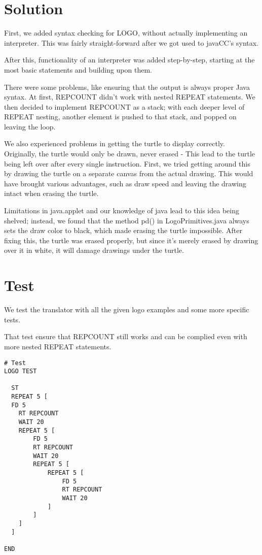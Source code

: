 \documentclass[a4paper, 12pt, parskip=full*]{scrreprt}
\begin{document}
\chapter{Solution}

First, we added syntax checking for LOGO, without actually implementing an interpreter. This was fairly straight-forward after we got used to javaCC's syntax.

After this, functionality of an interpreter was added step-by-step, starting at the most basic statements and building upon them.

There were some problems, like ensuring that the output is always proper Java syntax.
At first, REPCOUNT didn't work with nested REPEAT statements. We then decided to implement REPCOUNT as a stack; with each deeper level of REPEAT nesting, another element is pushed to that stack, and popped on leaving the loop.

We also experienced problems in getting the turtle to display correctly. Originally, the turtle would only be drawn, never erased - This lead to the turtle being left over after every single instruction.
First, we tried getting around this by drawing the turtle on a separate canvas from the actual drawing. This would have brought various advantages, such as draw speed and leaving the drawing intact when erasing the turtle.

Limitations in java.applet and our knowledge of java lead to this idea being shelved; instead, we found that the method pd() in LogoPrimitives.java always sets the draw color to black, which made erasing the turtle impossible.
After fixing this, the turtle was erased properly, but since it's merely erased by drawing over it in white, it will damage drawings under the turtle.

\chapter{Test}
We test the translator with all the given logo examples and some more specific tests.

That test ensure that REPCOUNT still works and can be complied even with more nested REPEAT statements.\\

\begin{lstlisting}[frame=single]
# Test 
LOGO TEST

  ST
  REPEAT 5 [
  FD 5
    RT REPCOUNT
    WAIT 20
	REPEAT 5 [
		FD 5
		RT REPCOUNT
		WAIT 20
		REPEAT 5 [
			REPEAT 5 [
				FD 5
				RT REPCOUNT 
				WAIT 20
			]
		]
	]
  ]

END
\end{lstlisting}
\end{document}
